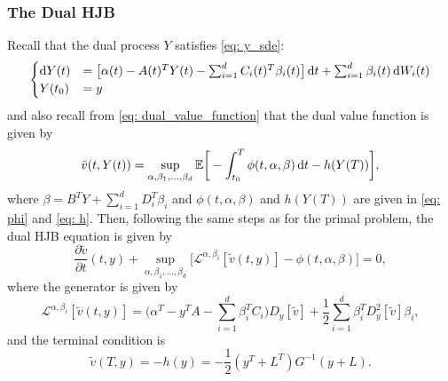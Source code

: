 \subsubsection{The Dual HJB}
Recall that the dual process $Y$ satisfies \eqref{eq: y_sde}:
\begin{equation*}
    \begin{cases}
        \mathop{}\!\mathrm{d} Y(t) &= \big[ \alpha(t) - A(t)^T Y(t) - \sum_{i=1}^d C_i(t)^T \beta_i(t)\big]\mathop{}\!\mathrm{d} t + \sum_{i=1}^d \beta_i(t) \mathop{}\!\mathrm{d} W_i(t)\\
        Y(t_0) &= y
    \end{cases}
\end{equation*}
and also recall from \eqref{eq: dual_value_function} that the dual value function is given by
\begin{equation*}
    \tilde{v}(t, Y(t)) = \sup_{\alpha, \beta_1, \dots, \beta_d} \mathbb{E} \bigg[ - \int_{t_0}^T \phi(t, \alpha, \beta) \mathop{}\!\mathrm{d} t - h(Y(T)) \bigg],
\end{equation*}
where $\beta = B^T Y + \sum_{i=1}^d D_i^T \beta_i$ and $\phi(t,\alpha, \beta)$ and $h(Y(T))$ are given in \eqref{eq: phi} and \eqref{eq: h}. Then, following the same steps as for the primal problem, the dual HJB equation is given by
\begin{equation*}
    \frac{\partial \tilde{v}}{\partial t} (t, y) + \sup_{\alpha, \beta_1, \dots, \beta_d} \big[\mathcal{L}^{\alpha, \beta_i}[\tilde{v}(t,y)] - \phi(t, \alpha, \beta) \big] = 0, %
\end{equation*}
where the generator is given by
\begin{equation*}
    \mathcal{L}^{\alpha, \beta_i}[\tilde{v}(t, y)] = \bigg(\alpha^T - y^T A - \sum_{i=1}^d \beta_i^T C_i\bigg)D_y[\tilde{v}] + \frac12 \sum_{i=1}^d \beta_i^T D_y^2[\tilde{v}] \beta_i,
\end{equation*}
and the terminal condition is
\begin{equation*}
    \tilde{v}(T,y) = - h(y) = - \frac12 (y^T + L^T) G^{-1} (y+ L).
\end{equation*}

